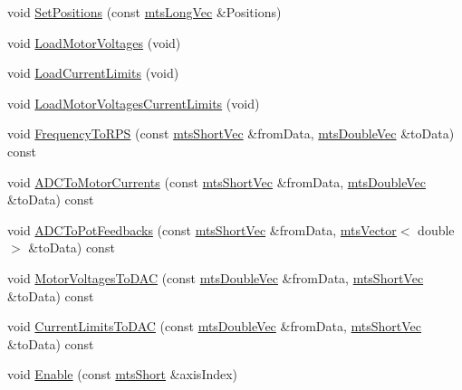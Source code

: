 \begin{DoxyCompactItemize}
\item 
void \hyperlink{classmts_lo_po_mo_co_ab1a20245e2e28f323973a9adf382c21f}{Set\+Positions} (const \hyperlink{mts_vector_8h_a3e011934ab1b5774f640a7bb70d9a672}{mts\+Long\+Vec} \&Positions)
\item 
void \hyperlink{classmts_lo_po_mo_co_a4c21cfc643adfa5b3df7db0d58b3a6a6}{Load\+Motor\+Voltages} (void)
\item 
void \hyperlink{classmts_lo_po_mo_co_a79ad0f5da6232c6359f2599f1f0d8335}{Load\+Current\+Limits} (void)
\item 
void \hyperlink{classmts_lo_po_mo_co_a47e5897e8beeb300c28046e4f5039864}{Load\+Motor\+Voltages\+Current\+Limits} (void)
\item 
void \hyperlink{classmts_lo_po_mo_co_a0b82596365920aba765d3fc04b929213}{Frequency\+To\+R\+P\+S} (const \hyperlink{mts_vector_8h_a70974166b1900882680f3002b69e11c5}{mts\+Short\+Vec} \&from\+Data, \hyperlink{mts_vector_8h_af69167a5dc2ad33eb93965b9387d8403}{mts\+Double\+Vec} \&to\+Data) const 
\item 
void \hyperlink{classmts_lo_po_mo_co_a3bb745819b0680a4a69119a121c358aa}{A\+D\+C\+To\+Motor\+Currents} (const \hyperlink{mts_vector_8h_a70974166b1900882680f3002b69e11c5}{mts\+Short\+Vec} \&from\+Data, \hyperlink{mts_vector_8h_af69167a5dc2ad33eb93965b9387d8403}{mts\+Double\+Vec} \&to\+Data) const 
\item 
void \hyperlink{classmts_lo_po_mo_co_a2a17c6e795d560987ae632aa6f141be5}{A\+D\+C\+To\+Pot\+Feedbacks} (const \hyperlink{mts_vector_8h_a70974166b1900882680f3002b69e11c5}{mts\+Short\+Vec} \&from\+Data, \hyperlink{classmts_vector}{mts\+Vector}$<$ double $>$ \&to\+Data) const 
\item 
void \hyperlink{classmts_lo_po_mo_co_a22c839b12f2c4d0877a2aa9e34784494}{Motor\+Voltages\+To\+D\+A\+C} (const \hyperlink{mts_vector_8h_af69167a5dc2ad33eb93965b9387d8403}{mts\+Double\+Vec} \&from\+Data, \hyperlink{mts_vector_8h_a70974166b1900882680f3002b69e11c5}{mts\+Short\+Vec} \&to\+Data) const 
\item 
void \hyperlink{classmts_lo_po_mo_co_a1b4780a38e6efbcdb6b80f2d8f9deae3}{Current\+Limits\+To\+D\+A\+C} (const \hyperlink{mts_vector_8h_af69167a5dc2ad33eb93965b9387d8403}{mts\+Double\+Vec} \&from\+Data, \hyperlink{mts_vector_8h_a70974166b1900882680f3002b69e11c5}{mts\+Short\+Vec} \&to\+Data) const 
\item 
void \hyperlink{classmts_lo_po_mo_co_a541a2df206472d07a224eedef7b8f201}{Enable} (const \hyperlink{mts_generic_object_proxy_8h_a169c76d3ebc9c8cf6c47d54425dc5097}{mts\+Short} \&axis\+Index)

\end{DoxyCompactItemize}
